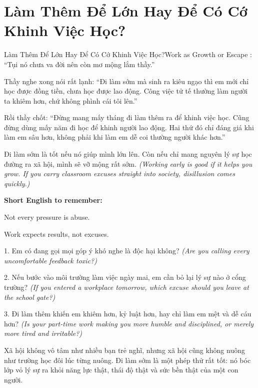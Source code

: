\section{Làm Thêm Để Lớn Hay Để Có Cớ Khinh Việc Học?}
\begin{truyen}{Làm Thêm Để Lớn Hay Để Có Cớ Khinh Việc Học?}{Work as Growth or Escape}
: ``Tụi nó chưa va đời nên còn mơ mộng lắm thầy.''

Thầy nghe xong nói rất lạnh: ``Đi làm sớm mà sinh ra kiêu ngạo thì em mới chỉ học được đồng tiền, chưa học được lao động. Công việc tử tế thường làm người ta khiêm hơn, chứ không phình cái tôi lên.''

Rồi thầy chốt: ``Đừng mang mấy tháng đi làm thêm ra để khinh việc học. Cũng đừng dùng mấy năm đi học để khinh người lao động. Hai thứ đó chỉ đáng giá khi làm em sâu hơn, không phải khi làm em dễ coi thường người khác hơn.''
\end{truyen}

\begin{baihoc}
Đi làm sớm là tốt nếu nó giúp mình lớn lên. Còn nếu chỉ mang nguyên lý sự học đường ra xã hội, mình sẽ vỡ mộng rất sớm.
\textit{(Working early is good if it helps you grow. If you carry classroom excuses straight into society, disillusion comes quickly.)}
\end{baihoc}

\begin{ghinhoanh}
\textbf{Short English to remember:}

Not every pressure is abuse.

Work expects results, not excuses.
\end{ghinhoanh}

\begin{tuhocnhanh}
1. Em có đang gọi mọi góp ý khó nghe là độc hại không? \textit{(Are you calling every uncomfortable feedback toxic?)}

2. Nếu bước vào môi trường làm việc ngày mai, em cần bỏ lại lý sự nào ở cổng trường? \textit{(If you entered a workplace tomorrow, which excuse should you leave at the school gate?)}

3. Đi làm thêm khiến em khiêm hơn, kỷ luật hơn, hay chỉ làm em mệt và dễ cáu hơn? \textit{(Is your part-time work making you more humble and disciplined, or merely more tired and irritable?)}
\end{tuhocnhanh}

\begin{tongketchuong}
Xã hội không vô tâm như nhiều bạn trẻ nghĩ, nhưng xã hội cũng không nuông như trường học đôi lúc từng nuông. Đi làm sớm là một phép thử rất tốt: nó bóc lớp vỏ lý sự ra khỏi năng lực thật, thái độ thật và sức bền thật của một con người.
\end{tongketchuong}

